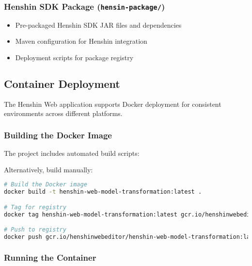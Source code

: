 \subsubsection{Henshin SDK Package (\texttt{hensin-package/})}

\begin{itemize}
    \item Pre-packaged Henshin SDK JAR files and dependencies
    \item Maven configuration for Henshin integration
    \item Deployment scripts for package registry
\end{itemize}

\subsection{Container Deployment}
\label{subsec:deployment}

The Henshin Web application supports Docker deployment for consistent environments across different platforms.

\subsubsection{Building the Docker Image}

The project includes automated build scripts:



Alternatively, build manually:

\begin{lstlisting}[language=bash]
# Build the Docker image
docker build -t henshin-web-model-transformation:latest .

# Tag for registry
docker tag henshin-web-model-transformation:latest gcr.io/henshinwebeditor/henshin-web-model-transformation:latest

# Push to registry
docker push gcr.io/henshinwebeditor/henshin-web-model-transformation:latest
\end{lstlisting}

\subsubsection{Running the Container}

